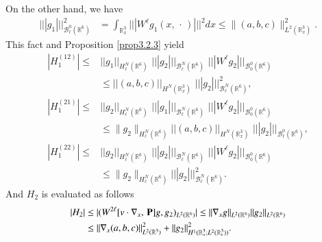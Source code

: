 \documentclass{amsart}[12pt, article]
\begin{document}
On the other hand, we have
\begin{align*}
||| g_1|||_{{{\mathcal B}}^{0}_\ell({{{\mathbb R}}}^6)}^2&=
\int_{{{{\mathbb R}}}^3_x} |||W^\ell
 g_1(x,\, \cdot\,)|||^2dx
\le \|(a,b,c)\|^2_{L^2({{{\mathbb R}}}^3_x)}.
\end{align*}
This fact and  Proposition \ref{prop3.2.3} yield
 \begin{align*}
|H_1^{(12)}|\le &||g_1||_{H^N_\ell({{{\mathbb R}}}^6)}\,\,
||| g_2|||_{{{\mathcal B}}^{N}_\ell({{{\mathbb R}}}^6)}\,\, |||W^\ell g_2|||_{{{\mathcal B}}^0_0({{{\mathbb R}}}^6)}
\\&
 \leq  ||(a,b,c)||_{H^N({{{\mathbb R}}}^3_x)}\,\,
 ||| g_2|||_{{{\mathcal B}}^{N}_\ell({{{\mathbb R}}}^6)}^2,
\\
|H_1^{(21)}|\le&||g_2||_{H^N_\ell({{{\mathbb R}}}^6)}\,\,
||| g_1|||_{{{\mathcal B}}^{N}_\ell({{{\mathbb R}}}^6)}\,\,|||W^\ell g_2|||_{{{\mathcal B}}^0_0({{{\mathbb R}}}^6)}
\\&
 \leq \|g_2\|_{H^N_\ell({{{\mathbb R}}}^6)} ||(a,b,c)||_{H^N({{{\mathbb R}}}^3_x)}\,\,
 ||| g_2|||_{{{\mathcal B}}^0_\ell({{{\mathbb R}}}^6)},
 \\
 |H_1^{(22)}|\le&||g_2||_{H^N_\ell({{{\mathbb R}}}^6)}\,\,
||| g_2|||_{{{\mathcal B}}^{N}_\ell({{{\mathbb R}}}^6)}\,\,
||| W^\ell g_2|||_{{{\mathcal B}}^0_0({{{\mathbb R}}}^6)}
\\&
 \leq \|g_2\|_{H^N_\ell({{{\mathbb R}}}^6)}
 ||| g_2|||_{{{\mathcal B}}^N_\ell({{{\mathbb R}}}^6)}^2.
 \end{align*}
And $H_2$ is evaluated as follows
\begin{align*}
|H_2|&\le|(W^{2\ell}[v\cdot\nabla_x,\, {{\bf P}}]g,   g_2)_{L^2({{{\mathbb R}}}^6)}|\le
\|\nabla_xg\|_{L^2({{{\mathbb R}}}^6)}\|g_2\|_{L^2({{{\mathbb R}}}^6)}
\\&\le
\|\nabla_x(a,b,c)\|_{L^2({{{\mathbb R}}}^3)}^2+\|g_2\|_{H^{1}({{{\mathbb R}}}^3_{x};L^2({{{\mathbb R}}}^3_v))}^2.
\end{align*}
\end{document}
